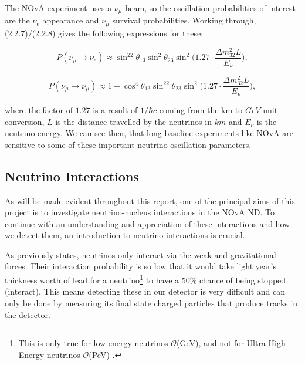 \documentclass[11pt]{article}
\begin{document}
The NOvA experiment uses a $\nu_{\mu}$ beam, so the oscillation probabilities of interest are the $\nu_e$ appearance and $\nu_{\mu}$ survival probabilities. Working through, (2.2.7)/(2.2.8) \cite{Thomson} gives the following expressions for these:

\begin{equation}
    P(\nu_{\mu} \xrightarrow{} \nu_e) \approx \sin^22\theta_{13} \sin^2\theta_{23}\sin^2\bigg(1.27 \cdot \frac{\Delta m^2_{32} L}{E_{\nu}}\bigg),
\end{equation}

\begin{equation}
    P(\nu_{\mu} \xrightarrow{} \nu_{\mu}) \approx 1 - \cos^4\theta_{13} \sin^22\theta_{23}\sin^2\bigg(1.27 \cdot \frac{\Delta m^2_{32} L}{E_{\nu}}\bigg),
\end{equation}

where the factor of $1.27$ is a result of $1/\hbar c$ coming from the km to $GeV$ unit conversion, $L$ is the distance travelled by the neutrinos in $km$ and $E_{\nu}$ is the neutrino energy. We can see then, that long-baseline experiments like NOvA are sensitive to some of these important neutrino oscillation parameters. %

%

\subsection{Neutrino Interactions}
As will be made evident throughout this report, one of the principal aims of this project is to investigate neutrino-nucleus interactions in the NOvA ND. To continue with an understanding and appreciation of these interactions and how we detect them, an introduction to neutrino interactions is crucial.

As previously states, neutrinos only interact via the weak and gravitational forces. Their interaction probability is so low that it would take light year's thickness worth of lead for a neutrino\footnote{This is only true for low energy neutrinos $\mathcal{O}$(GeV), and not for Ultra High Energy neutrinos $\mathcal{O}$(PeV) \cite{madsen}.} to have a 50\% chance of being stopped (interact). This means detecting these in our detector is very difficult and can only be done by measuring its final state charged particles that produce tracks in the detector.
\end{document}
